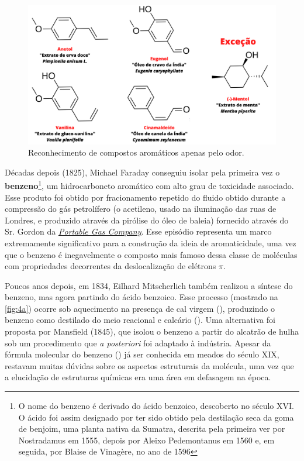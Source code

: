 \begin{figure}[htb!]
	\caption{Reconhecimento de compostos aromáticos apenas pelo odor.}\label{fig:odor}
	\begin{center}
		\includegraphics[width=1.0\textwidth]{images/MOs(1).png}
	\end{center}
\end{figure}


Décadas depois (1825), Michael Faraday\autocite{Faraday1925, Wilson2012, Martin2015} conseguiu isolar pela primeira vez o \textbf{benzeno}\footnote{O nome do benzeno é derivado do ácido benzoico, descoberto no século XVI. O ácido foi assim designado por ter sido obtido pela destilação seca da goma de benjoim, uma planta nativa da Sumatra, descrita pela primeira ver por Nostradamus em 1555, depois por Aleixo Pedemontanus em 1560 e, em seguida, por Blaise de Vinagère, no ano de 1596}, um hidrocarboneto aromático com alto grau de toxicidade associado\autocite{Solomon1977}. Esse produto foi obtido por fracionamento repetido do fluido obtido durante a compressão do gás petrolífero (o acetileno, usado na iluminação das ruas de Londres, e produzido através da pirólise do óleo de baleia) fornecido através do Sr. Gordon da \href{https://portablegas.co.uk/}{\textit{Portable Gas Company}}. Esse episódio representa um marco extremamente significativo para a construção da ideia de aromaticidade, uma vez que o benzeno é inegavelmente o composto mais famoso dessa classe de moléculas com propriedades decorrentes da deslocalização de elétrons $\pi$\autocite{Faraday1825}. 

Poucos anos depois, em 1834, Eilhard Mitscherlich também realizou a síntese do benzeno, mas agora partindo do ácido benzoico. Esse processo (mostrado na \autoref{fig:4a}) ocorre sob aquecimento na presença de cal virgem (), produzindo o benzeno como destilado do meio reacional e calcário (). Uma alternativa foi proposta por Mansfield (1845), que isolou o benzeno a partir do alcatrão de hulha sob um procedimento que \textit{a posteriori} foi adaptado à indústria. Apesar da fórmula molecular do benzeno () já ser conhecida em meados do século XIX, restavam muitas dúvidas sobre os aspectos estruturais da molécula, uma vez que a elucidação de estruturas químicas era uma área em defasagem na época. 

